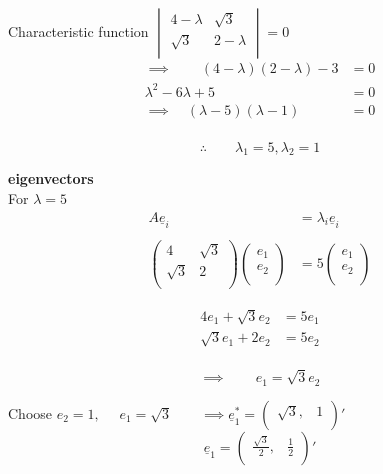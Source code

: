 \documentclass[11pt,a4paper]{article}
\theoremstyle{definition}
\begin{document}
Characteristic function $\begin{vmatrix}
4 - \lambda & \sqrt{3}\\
\sqrt{3} & 2-\lambda\\
\end{vmatrix} = 0$
\begin{align*}
\implies\qquad  (4 - \lambda) (2 - \lambda) - 3 & = 0\\
\lambda^2 - 6\lambda + 5 & =0\\
\implies\quad  (\lambda -5)(\lambda - 1) & =0\\
\end{align*}

$$\therefore\qquad  \lambda_1 =5,  \lambda_2 = 1$$











\pagebreak

\textbf{eigenvectors}\\

For $\lambda = 5$
\begin{align*}
A\underline{e}_i & = \lambda_i \underline{e}_i\\\\
\begin{pmatrix}
4 & \sqrt{3}\\
\sqrt{3} & 2\\
\end{pmatrix}\begin{pmatrix}
e_1\\
e_2\\
\end{pmatrix} & = 5\begin{pmatrix}
e_1\\
e_2\\
\end{pmatrix}
\end{align*}


\begin{align*}
4e_1 + \sqrt{3}e_2 & = 5e_1\\
\sqrt{3}e_1 + 2e_2 & = 5e_2\\
\end{align*}

$$\implies\qquad  e_1 = \sqrt{3}e_2$$


Choose $e_2 =1,$ $\quad  e_1 = \sqrt{3}\qquad \implies \underline{e}_1^* = 
\begin{pmatrix}
\sqrt{3}, & 1\\
\end{pmatrix}'$ 
$$\underline{e}_1 = \begin{pmatrix}
\frac{\sqrt{3}}{2}, & \frac{1}{2}\\
\end{pmatrix}'$$\\\\
\end{document}
